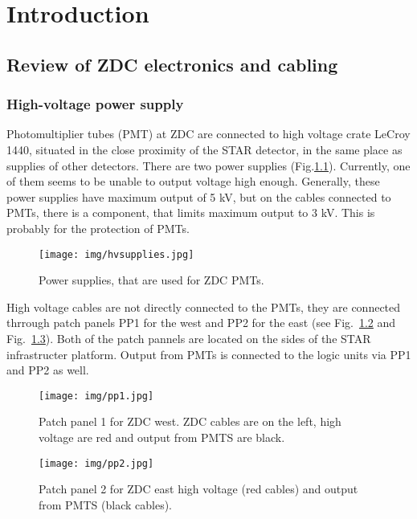 \chapter{Introduction}

\section{Review of ZDC electronics and cabling}

\subsection{High-voltage power supply}
Photomultiplier tubes (PMT) at ZDC are connected to high voltage crate LeCroy 1440, situated in the close proximity of the STAR detector, in the same place as supplies of other detectors. There are two power supplies (Fig.\ref{hvsupplies}). Currently, one of them seems to be unable to output voltage high enough. Generally, these power supplies have maximum output of 5 kV, but on the cables connected to PMTs, there is a component, that limits maximum output to 3 kV. This is probably for the protection of PMTs.

\begin{figure}[htb]
\begin{center}
\texttt{[image: img/hvsupplies.jpg]}
\end{center}
\caption{Power supplies, that are used for ZDC PMTs.}
\label{hvsupplies}
\end{figure}

High voltage cables are not directly connected to the PMTs, they are connected thrrough patch panels PP1 for the west and PP2 for the east (see Fig.~\ref{pp1} and Fig.~\ref{pp2}). Both of the patch pannels are located on the sides of the STAR infrastructer platform. Output from PMTs is connected to the logic units via PP1 and PP2 as well.

\begin{figure}[htb]
\begin{center}
\texttt{[image: img/pp1.jpg]}
\end{center}
\caption{Patch panel 1 for ZDC west.  ZDC cables are on the left, high voltage are red and output from PMTS are black.}
\label{pp1}
\end{figure}

\begin{figure}[htb]
\begin{center}
\texttt{[image: img/pp2.jpg]}
\end{center}
\caption{Patch panel 2 for ZDC east high voltage (red cables) and output from PMTS (black cables).}
\label{pp2}
\end{figure}

